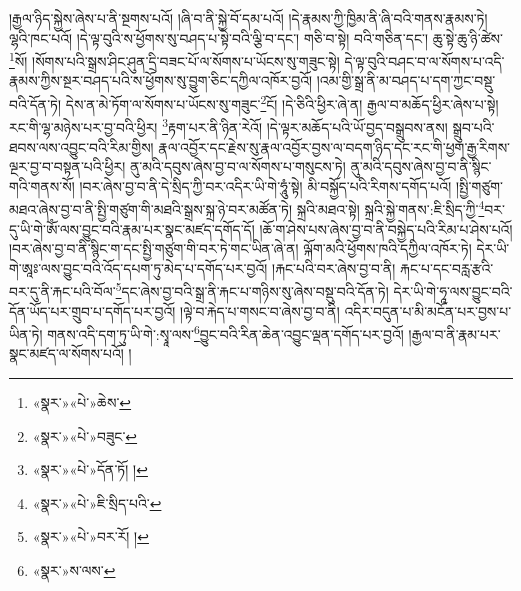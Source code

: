 །རྒྱལ་ཉིད་སྐྱེས་ཞེས་པ་ནི་སྔགས་པའོ། །ཞི་བ་ནི་སྐྱེ་བོ་དམ་པའོ། །དེ་རྣམས་ཀྱི་ཁྱིམ་ནི་ཞི་བའི་གནས་རྣམས་ཏེ། ལྷའི་ཁང་པའོ། །དེ་ལྟ་བུའི་ས་ཕྱོགས་སུ་བཤད་པ་སྟེ་བའི་ལྕི་བ་དང་། གཅི་བ་སྟེ། བའི་གཅིན་དང་། ཆུ་སྟེ་ཆུ་ཉི་ཚེས་\footnote{«སྣར་»«པེ་»ཆེས་}སོ། །སོགས་པའི་སྒྲས་ཤིང་ཤུན་དྲི་བཟང་པོ་ལ་སོགས་པ་ཡོངས་སུ་གཟུང་སྟེ། དེ་ལྟ་བུའི་བཤང་བ་ལ་སོགས་པ་འདི་རྣམས་ཀྱིས་སྔར་བཤད་པའི་ས་ཕྱོགས་སུ་བྱུག་ཅིང་དཀྱིལ་འཁོར་བྱའོ། །འམ་གྱི་སྒྲ་ནི་མ་བཤད་པ་དག་ཀྱང་བསྡུ་བའི་དོན་ཏེ། དེས་ན་མེ་ཏོག་ལ་སོགས་པ་ཡོངས་སུ་གཟུང་\footnote{«སྣར་»«པེ་»བཟུང་}ངོ། །དེ་ཅིའི་ཕྱིར་ཞེ་ན། རྒྱལ་བ་མཆོད་ཕྱིར་ཞེས་པ་སྟེ། རང་གི་ལྷ་མཉེས་པར་བྱ་བའི་ཕྱིར། \footnote{«སྣར་»«པེ་»དོན་ཏོ། ། }རྟག་པར་ནི་ཉིན་རེའོ། །དེ་ལྟར་མཆོད་པའི་ཡོ་བྱད་བསྒྲུབས་ནས། སྒྲུབ་པའི་ཐབས་ལས་འབྱུང་བའི་རིམ་གྱིས། རྣལ་འབྱོར་དང་རྗེས་སུ་རྣལ་འབྱོར་བྱས་ལ་བདག་ཉིད་དང་རང་གི་ཕྱག་རྒྱ་རིགས་ལྔར་བྱ་བ་བསྟན་པའི་ཕྱིར། ནུ་མའི་དབུས་ཞེས་བྱ་བ་ལ་སོགས་པ་གསུངས་ཏེ། ནུ་མའི་དབུས་ཞེས་བྱ་བ་ནི་སྙིང་གའི་གནས་སོ། །བར་ཞེས་བྱ་བ་ནི་དེ་སྲིད་ཀྱི་བར་འདིར་ཡི་གེ་ཧཱུཾ་སྟེ། མི་བསྐྱོད་པའི་རིགས་དགོད་པའོ། །སྤྱི་གཙུག་མཐའ་ཞེས་བྱ་བ་ནི་སྤྱི་གཙུག་གི་མཐའི་སྒྲས་སྐྲ་ཉེ་བར་མཚོན་ཏེ། སྐྲའི་མཐའ་སྟེ། སྐྲའི་སྐྱེ་གནས་:ཇི་སྲིད་ཀྱི་\footnote{«སྣར་»«པེ་»ཇི་སྲིད་པའི་}བར་དུ་ཡི་གེ་ཨོཾ་ལས་བྱུང་བའི་རྣམ་པར་སྣང་མཛད་དགོད་དོ། །ཆོ་ག་ཤེས་པས་ཞེས་བྱ་བ་ནི་བསྐྱེད་པའི་རིམ་པ་ཤེས་པའོ། །བར་ཞེས་བྱ་བ་ནི་སྙིང་ག་དང་སྤྱི་གཙུག་གི་བར་ཏེ་གང་ཡིན་ཞེ་ན། ལྐོག་མའི་ཕྱོགས་ཁའི་དཀྱིལ་འཁོར་ཏེ། དེར་ཡི་གེ་ཨཱཿ་ལས་བྱུང་བའི་འོད་དཔག་ཏུ་མེད་པ་དགོད་པར་བྱའོ། །རྐང་པའི་བར་ཞེས་བྱ་བ་ནི། རྐང་པ་དང་བརླ་རྩའི་བར་དུ་ནི་རྐང་པའི་བོལ་\footnote{«སྣར་»«པེ་»བར་རོ། །}དང་ཞེས་བྱ་བའི་སྒྲ་ནི་རྐང་པ་གཉིས་སུ་ཞེས་བསྡུ་བའི་དོན་ཏེ། དེར་ཡི་གེ་ཧཱ་ལས་བྱུང་བའི་དོན་ཡོད་པར་གྲུབ་པ་དགོད་པར་བྱའོ། །ལྟེ་བ་རྐེད་པ་གསང་བ་ཞེས་བྱ་བ་ནི། འདིར་བདུན་པ་མི་མངོན་པར་བྱས་པ་ཡིན་ཏེ། གནས་འདི་དག་ཏུ་ཡི་གེ་:སྭཱ་ལས་\footnote{«སྣར་»ས་ལས་}བྱུང་བའི་རིན་ཆེན་འབྱུང་ལྡན་དགོད་པར་བྱའོ། །རྒྱལ་བ་ནི་རྣམ་པར་སྣང་མཛད་ལ་སོགས་པའོ། །
